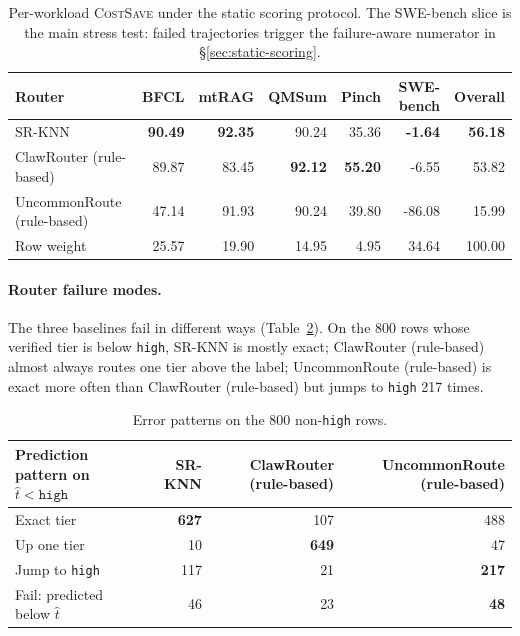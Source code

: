 \begin{table}[ht]
\centering
\scriptsize
\begin{tabular}{lrrrrrr}
\toprule
Router & BFCL & mtRAG & QMSum & Pinch & SWE-bench & Overall \\
\midrule
SR-KNN       & \textbf{90.49} & \textbf{92.35} & 90.24 & 35.36 & \textbf{-1.64} & \textbf{56.18} \\
ClawRouter (rule-based) & 89.87 & 83.45 & \textbf{92.12} & \textbf{55.20} & -6.55 & 53.82 \\
UncommonRoute (rule-based) & 47.14 & 91.93 & 90.24 & 39.80 & -86.08 & 15.99 \\
\midrule
Row weight  & 25.57 & 19.90 & 14.95 & 4.95 & 34.64 & 100.00 \\
\bottomrule
\end{tabular}
\caption{Per-workload \textsc{CostSave} under the static scoring protocol.
The SWE-bench slice is the main stress test: failed trajectories trigger the
failure-aware numerator in \S\ref{sec:static-scoring}.}
\label{tab:per-benchmark}
\end{table}

\paragraph{Router failure modes.}
\label{sec:error-patterns}

The three baselines fail in different ways (Table~\ref{tab:error-patterns}). On
the 800 rows whose verified tier is below \texttt{high}, SR-KNN is mostly
exact; ClawRouter (rule-based) almost always routes one tier above the label; UncommonRoute
(rule-based) is exact more often than ClawRouter (rule-based) but jumps to \texttt{high}
217 times.

\begin{table}[ht]
\centering
\small
\begin{tabular}{lrrr}
\toprule
Prediction pattern on $\hat{t}<\texttt{high}$ & SR-KNN & ClawRouter (rule-based) & UncommonRoute (rule-based) \\
\midrule
Exact tier                         & \textbf{627} & 107 & 488 \\
Up one tier                         & 10 & \textbf{649} & 47 \\
Jump to \texttt{high}               & 117 & 21 & \textbf{217} \\
Fail: predicted below $\hat{t}$     & 46 & 23 & \textbf{48} \\
\bottomrule
\end{tabular}
\caption{Error patterns on the 800 non-\texttt{high} rows.}
\label{tab:error-patterns}
\end{table}

